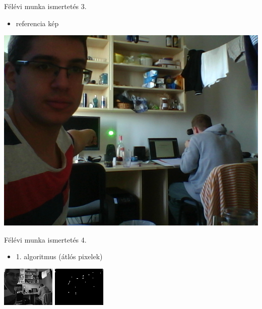 \documentclass[17pt,xcolor=x11names]{beamer}
\begin{document}
\begin{frame}{Félévi munka ismertetés 3.}
\begin{itemize}
\item referencia kép
\end{itemize}
\begin{center}
\includegraphics[scale=0.35]{figs/laser.png}
\end{center}
\end{frame}

\begin{frame}{Félévi munka ismertetés 4.}
\begin{itemize}
\item 1. algoritmus (átlós pixelek)
\end{itemize}
\begin{center}
\includegraphics[scale=1.5]{figs/laser1-a.png}
\hspace{20pt}
\includegraphics[scale=1.5]{figs/laser1-b.png}
\end{center}
\end{frame}
\end{document}
